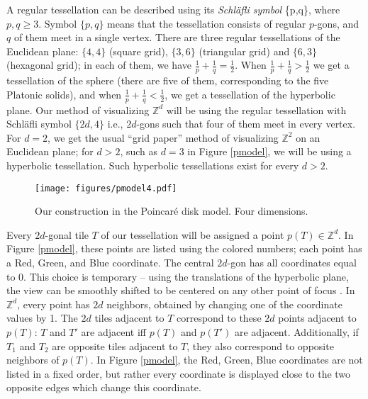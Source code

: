\documentclass{article}
\begin{document}
A regular tessellation can be described using its \emph{Schl\"afli symbol} \{p,q\}, where
$p,q\geq 3$. Symbol $\{p,q\}$ means
that the tessellation consists of regular $p$-gons, and $q$ of them meet in a single vertex.
There are three regular tessellations of the Euclidean plane: $\{4,4\}$ (square grid), $\{3,6\}$
(triangular grid) and $\{6,3\}$ (hexagonal grid); in each of them, we have $\frac{1}{p} + \frac{1}{q} = \frac{1}{2}$.
When $\frac{1}{p} + \frac{1}{q} > \frac{1}{2}$ we get a tessellation of the sphere (there
are five of them, corresponding to the five Platonic solids), and 
when $\frac{1}{p} + \frac{1}{q} < \frac{1}{2}$, we get a tessellation of the hyperbolic plane.
Our method of visualizing $\mathbb{Z}^d$ will be using the regular tessellation with Schl\"afli symbol $\{2d,4\}$
i.e., $2d$-gons such that four of them meet in every vertex. For $d=2$, we get the usual ``grid paper'' method of
visualizing $\mathbb{Z}^2$ on an Euclidean plane; for $d>2$, such as $d=3$ in Figure \ref{pmodel}, we will be using
a hyperbolic tessellation. Such hyperbolic tessellations exist for every $d>2$.

\begin{figure}
\texttt{[image: figures/pmodel4.pdf]}
\caption{Our construction in the Poincar\'e disk model. Four dimensions.\label{pmodel4}}
\end{figure}

Every $2d$-gonal tile $T$ of our tessellation will be assigned a point $p(T) \in \mathbb{Z}^d$. In Figure \ref{pmodel},
these points are listed using the colored numbers; each point has a Red, Green, and Blue coordinate. The central
$2d$-gon has all coordinates equal to 0. This choice is temporary -- using the translations of the hyperbolic plane,
the view can be smoothly shifted to be centered on any other point of focus \cite{hyptree}. In $\mathbb{Z}^d$, every point has $2d$ neighbors,
obtained by changing one of the coordinate values by 1. The $2d$ tiles adjacent to $T$ correspond to these $2d$ points adjacent
to $p(T)$: $T$ and $T'$ are adjacent iff $p(T)$ and $p(T')$ are adjacent. Additionally, if $T_1$ and $T_2$ are opposite
tiles adjacent to $T$, they also correspond to opposite neighbors of $p(T)$. In Figure \ref{pmodel}, the Red, Green, Blue
coordinates are not listed in a fixed order, but rather every coordinate is displayed close to the two opposite edges which
change this coordinate.
\end{document}

